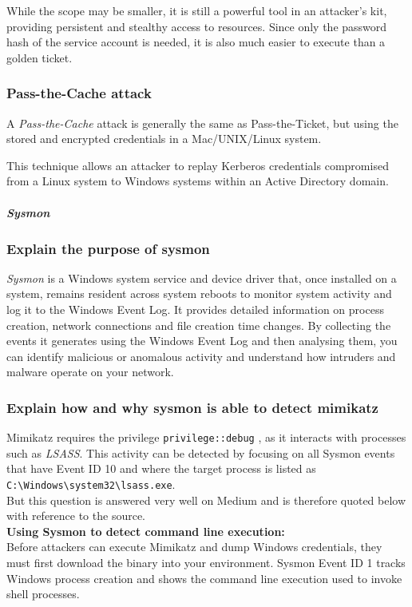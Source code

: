 While the scope may be smaller, it is still a powerful tool in an attacker's kit, providing persistent and stealthy access to resources. Since only the password hash of the service account is needed, it is also much easier to execute than a golden ticket.

\subsubsection{Pass-the-Cache attack}
A \textit{Pass-the-Cache} attack is generally the same as Pass-the-Ticket, but using the stored and encrypted credentials in a Mac/UNIX/Linux system.

This technique allows an attacker to replay Kerberos credentials compromised from a Linux system to Windows systems within an Active Directory domain.

\subparagraph{Sysmon}

\subsubsection{Explain the purpose of sysmon}
\textit{Sysmon} is a Windows system service and device driver that, once installed on a system, remains resident across system reboots to monitor system activity and log it to the Windows Event Log. It provides detailed information on process creation, network connections and file creation time changes. By collecting the events it generates using the Windows Event Log and then analysing them, you can identify malicious or anomalous activity and understand how intruders and malware operate on your network.

\subsubsection{Explain how and why sysmon is able to detect mimikatz}
Mimikatz requires the privilege \lstinline|privilege::debug| , as it interacts with processes such as \textit{LSASS}. This activity can be detected by focusing on all Sysmon events that have Event ID 10 and where the target process is listed as \lstinline|C:\Windows\system32\lsass.exe|.\\

But this question is answered very well on Medium and is therefore quoted below with reference to the source.\\

\textbf{Using Sysmon to detect command line execution:}\\
Before attackers can execute Mimikatz and dump Windows credentials, they must first download the binary into your environment. Sysmon Event ID 1 tracks Windows process creation and shows the command line execution used to invoke shell processes.\\

